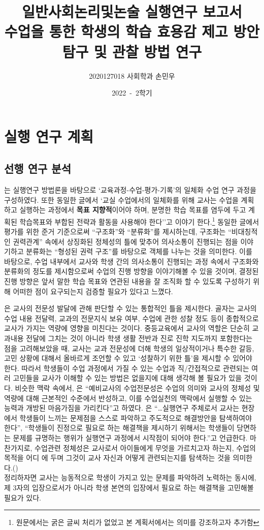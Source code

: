 \documentclass[10pt, a4paper, chapter]{oblivoir}
\date{\large 2022~-~2학기}
\title{\Huge 일반사회논리및논술 실행연구 보고서\\
    \LARGE 수업을 통한 학생의 학습 효용감 제고 방안 탐구 및 관찰 방법 연구}
\author{\Large 2020127018 사회학과 손민우}
\begin{document}
\maketitle
\tableofcontents*
\pagebreak
\chapter{실행 연구 계획}
    \section{선행 연구 분석}
    \cite{정민수2018교육과정}는 실행연구 방법론을 바탕으로 `교육과정-수업-평가-기록'의 일체화 수업 연구 과정을 구성하였다. 
    또한 동일한 글에서 `교실 수업에서의 일체화를 위해 교사는 수업을 계획하고 실행하는 과정에서 \textbf{목표 지향적}이어야 하며, 
    분명한 학습 목표를 염두에 두고 계획된 학습목표와 부합된 전략과 활동을 사용해야 한다''고 이야기 한다.\footnote{원문에서는 굵은 글씨 처리가 없었고 본 계획서에서는 의미를 강조하고자 추가함} 동일한 글에서 평가를 위한 준거 기준으로써 
    ``구조화''와 ``분류화''를 제시하는데, 구조화는 ``비대칭적인 권력관계'' 속에서 상징화된 정체성의 틀에 맞추어 의사소통이 진행되는 점을 
    이야기하고 분류화는 ``형성된 권력 구조''를 바탕으로 객체를 나누는 것을 의미한다. 이를 바탕으로, 수업 내부에서 교사와 학생 간의 
    의사소통이 진행되는 과정 속에서 구조화와 분류화의 정도를 제시함으로써 수업의 진행 방향을 이야기해볼 수 있을 것이며, 결정된 진행 방향은
    앞서 말한 학습 목표와 연관된 내용을 잘 조직화 할 수 있도록 구성하기 위해 어떠한 점이 요구되는지 검증할 필요가 있다고 느꼈다. 

    \cite{강대현2013사회과}은 교사의 전문성 발달에 관해 판단할 수 있는 통합적인 틀을 제시한다. 골자는 교사의 수업 내용 전달력, 교과의 전문지식 보유 여부,
    수업에 관한 성찰 정도 등이 종합적으로 교사가 가지는 역량에 영향을 미친다는 것이다. 중등교육에서 교사의 역할은 단순히 교과내용 전달에 그치는 것이
    아니라 학생 생활 전반과 진로 진학 지도까지 포함한다는 점을 고려해보았을 때, 교사는 교과 전문성에 더해 학생의 일상적이거나 특수한 갈등, 고민 상황에 대해서 
    올바르게 조언할 수 있고 `성찰하기 위한 틀'을 제시할 수 있어야 한다. 따라서 학생들이 수업 과정에서 가질 수 있는 수업과 직/간접적으로 관련되는 
    여러 고민들을 교사가 이해할 수 있는 방법은 없을지에 대해 생각해 볼 필요가 있을 것이다. 비슷한 맥락 속에서,
    \cite{한광웅2010사회과}은 ``예비교사의 수업전문성은 수업의 의미와 교사의 정체성 및 역량에 대해 근본적인 수준에서 반성하고,
    이를 수업실천의 맥락에서 실행할 수 있는 능력과 개방된 마음가짐을 가리킨다''고 하였다. \cite{leeEnglish}은 ``\dots 실행연구 주체로서 교사는 
    현장에서 학생들이 느끼는 문제점을 스스로 파악하고 주도적으로 해결방안을 탐색하여야 한다'', ``학생들이 진정으로 필요로 하는 해결책을 제시하기 위해서는 
    학생들이 당면하는 문제를 규명하는 행위가 실행연구 과정에서 시작점이 되어야 한다.''고 언급한다. 마찬가지로, 수업관련 정체성은 교사로서 아이들에게 무엇을 가르치고자 하는지, 수업의 목적을 어디
    에 두며 그것이 교사 자신과 어떻게 관련되는지를 탐색하는 것을 의미한다.(\cite{강지영2011국내})\\
    정리하자면 교사는 능동적으로 학생이 가지고 있는 문제를 파악하려 노력하는 동시에, 제 3자의 입장으로서가 아니라 학생 본연의 입장에서 
    필요로 하는 해결책을 고민해볼 필요가 있다. 
\end{document}
